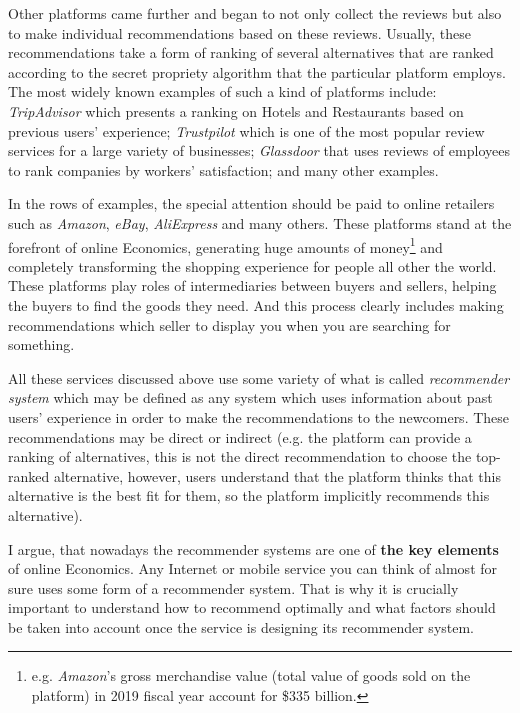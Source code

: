 \documentclass[a4paper]{article}
\begin{document}
	
	
	
	
Other platforms came further and began to not only collect the reviews but also to make individual recommendations based on these reviews. Usually, these recommendations take a form of ranking of several alternatives that are ranked according to the secret propriety algorithm that the particular platform employs. The most widely known examples of such a kind of platforms include: \textit{TripAdvisor} which presents a ranking on Hotels and Restaurants based on previous users' experience; \textit{Trustpilot} which is one of the most popular review services for a large variety of businesses; \textit{Glassdoor} that uses reviews of employees to rank companies by workers' satisfaction; and many other examples. 
	
	
	
	
In the rows of examples, the special attention should be paid to online retailers such as \textit{Amazon}, \textit{eBay}, \textit{AliExpress} and many others. These platforms stand at the forefront of online Economics, generating huge amounts of money\footnote{e.g. \textit{Amazon}'s gross merchandise value (total value of goods sold on the platform) in 2019 fiscal year account for \$335 billion.} and completely transforming the shopping experience for people all other the world. These platforms play roles of intermediaries between buyers and sellers, helping the buyers to find the goods they need. And this process clearly includes making recommendations which seller to display you when you are searching for something.	
	
	
	All these services discussed above use some variety of what is called \textit{recommender system} which may be defined as any system which uses information about past users' experience in order to make the recommendations to the newcomers. These recommendations may be direct or indirect (e.g. the platform can provide a ranking of alternatives, this is not the direct recommendation to choose the top-ranked alternative, however, users understand that the platform thinks that this alternative is the best fit for them, so the platform implicitly recommends this alternative). 
	
	
	
	
	
I argue, that nowadays the recommender systems are one of \textbf{the key elements} of online Economics. Any Internet or mobile service you can think of almost for sure uses some form of a recommender system. That is why it is crucially important to understand how to recommend optimally and what factors should be taken into account once the service is designing its recommender system.
	
\end{document}
